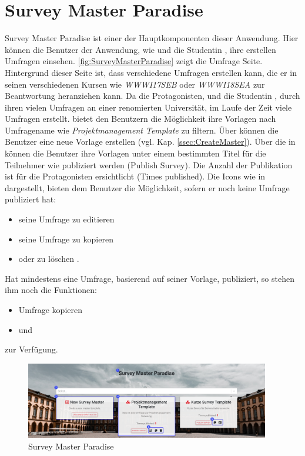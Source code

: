 \section{Survey Master Paradise}
\label{ssec:SurveyMasterParadise}
Survey Master Paradise ist einer der Hauptkomponenten dieser Anwendung. 
Hier können die Benutzer der Anwendung, wie \dutzi und die Studentin \ariane, ihre erstellen Umfragen einsehen. 
\abb \vref{fig:SurveyMasterParadise} zeigt die Umfrage Seite. 
Hintergrund dieser Seite ist, dass \dutzi verschiedene Umfragen erstellen kann, die er in seinen verschiedenen Kursen wie \zb \emph{WWWI17SEB} oder \emph{WWWI18SEA} zur Beantwortung heranziehen kann. %
Da die Protagonisten, \dutzi und die Studentin \ariane, durch ihren vielen Umfragen an einer renomierten Universität, im Laufe der Zeit viele Umfragen erstellt. 
\desTwo bietet den Benutzern die Möglichkeit ihre Vorlagen nach Umfragename wie \zb \emph{Projektmanagement Template} zu filtern. 
Über \desThree können die Benutzer eine neue Vorlage erstellen (vgl. Kap. \vref{ssec:CreateMaster}). \newline
Über die in \desFour können die Benutzer ihre Vorlagen unter einem bestimmten Titel für die Teilnehmer wie \weigert publiziert werden (Publish Survey). 
Die Anzahl der Publikation ist für die Protagonisten ersichtlicht (Times published). \newline
Die Icons wie in \desFive dargestellt, bieten dem Benutzer die Möglichkeit, sofern er noch keine Umfrage publiziert hat:
% 
\begin{itemize}
    \item seine Umfrage zu editieren \faEdit
    \item seine Umfrage zu kopieren \faCopy
    \item oder zu löschen \faTrash.
\end{itemize}
% 
Hat \zb \dutzi mindestens eine Umfrage, basierend auf seiner Vorlage, publiziert, so stehen ihm noch die Funktionen:
\begin{itemize}
    \item Umfrage kopieren \faCopy
    \item und \faIdCard
\end{itemize} 

zur Verfügung. 

\begin{figure}[H]
	\centering
	\includegraphics[width=0.95\textwidth, keepaspectratio]{img/guide/SurveyMasterParadise.png}
	\captionsetup{justification=centering, format=plain}
	\caption[Survey Master Paradise]{Survey Master Paradise \\\quelleScreenshot}
	\label{fig:SurveyMasterParadise}
\end{figure}


